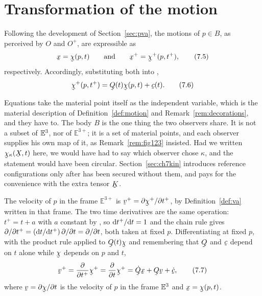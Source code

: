 \section{Transformation of the motion}\label{sec:ch7motion}

Following the development of Section~\ref{sec:pva}, the motions of
$p\in B$, as perceived by $O$ and $O^{+}$, are expressible as
\begin{equation}
   \bx=\bchi(p,t)
   \qquad\text{and}\qquad
   \bx^{+}=\bchi^{+}(p,t^{+}),
   \tag{7.5}\label{eq:7.5}
\end{equation}
respectively. Accordingly, substituting both into ,
\begin{equation}
   \bchi^{+}(p,t^{+})=\bQ(t)\bchi(p,t)+\bc(t).
   \tag{7.6}\label{eq:7.6}
\end{equation}

\begin{remark}\label{rem:ch7whyp}
Equations  take the material point itself as the independent
variable, which is the material description of
Definition~\ref{def:motion} and Remark~\ref{rem:decorations}, and they
have to. The body $B$ is the one thing the two observers share. It is not
a subset of $\mathbb{E}^{3}$, nor of $\mathbb{E}^{3+}$; it is a set of material
points, and each observer supplies his own map of it, as
Remark~\ref{rem:fig123} insisted. Had we written $\bchi_{\kappa}(\bX,t)$
here, we would have had to say which observer chose $\kappa$, and the
statement  would have been circular. Section~\ref{sec:ch7kin}
introduces reference configurations only after  has been secured
without them, and pays for the convenience with the extra tensor $\bK$.
\end{remark}

The velocity of $p$ in the frame $\mathbb{E}^{3+}$ is
$\bv^{+}=\partial\bchi^{+}/\partial t^{+}$, by
Definition~\ref{def:va} written in that frame. The two time derivatives
are the same operation: $t^{+}=t+a$ with $a$ constant by , so
$\mathrm{d} t^{+}/\mathrm{d} t=1$ and the chain rule gives
$\partial/\partial t^{+}=(\mathrm{d} t/\mathrm{d} t^{+})\,\partial/\partial t
=\partial/\partial t$, both taken at fixed $p$. Differentiating
 at fixed $p$, with the product rule applied to $\bQ(t)\bchi$
and remembering that $\bQ$ and $\bc$ depend on $t$ alone while $\bchi$
depends on $p$ and $t$,
\begin{equation}
   \bv^{+}=\frac{\partial}{\partial t^{+}}\bchi^{+}
   =\frac{\partial}{\partial t}\bchi^{+}
   =\dot\bQ\bx+\bQ\bv+\dot\bc ,
   \tag{7.7}\label{eq:7.7}
\end{equation}
where $\bv=\partial\bchi/\partial t$ is the velocity of $p$ in the frame
$\mathbb{E}^{3}$ and $\bx=\bchi(p,t)$.

